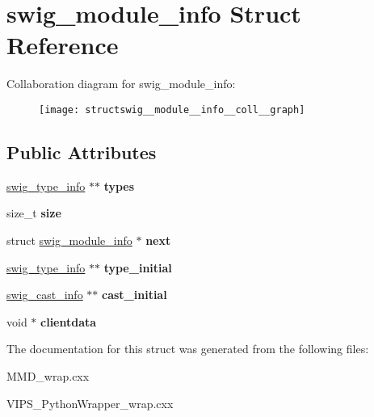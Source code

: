 \hypertarget{structswig__module__info}{}\section{swig\+\_\+module\+\_\+info Struct Reference}
\label{structswig__module__info}


Collaboration diagram for swig\+\_\+module\+\_\+info\+:\nopagebreak
\begin{figure}[H]
\begin{center}
\leavevmode
\texttt{[image: structswig\_\_module\_\_info\_\_coll\_\_graph]}
\end{center}
\end{figure}
\subsection*{Public Attributes}
\begin{DoxyCompactItemize}
\item 
\hyperlink{structswig__type__info}{swig\+\_\+type\+\_\+info} $\ast$$\ast$ {\bfseries types}\hypertarget{structswig__module__info_a0a70e9ae189c2a26c92adbf2fabcd549}{}\label{structswig__module__info_a0a70e9ae189c2a26c92adbf2fabcd549}

\item 
size\+\_\+t {\bfseries size}\hypertarget{structswig__module__info_aaf8907cf8509ee0464af8c9dfd909042}{}\label{structswig__module__info_aaf8907cf8509ee0464af8c9dfd909042}

\item 
struct \hyperlink{structswig__module__info}{swig\+\_\+module\+\_\+info} $\ast$ {\bfseries next}\hypertarget{structswig__module__info_adc59649870cda1ab12f45e57de99e572}{}\label{structswig__module__info_adc59649870cda1ab12f45e57de99e572}

\item 
\hyperlink{structswig__type__info}{swig\+\_\+type\+\_\+info} $\ast$$\ast$ {\bfseries type\+\_\+initial}\hypertarget{structswig__module__info_aaf36c0bb2e9e796ff1576359d52507c9}{}\label{structswig__module__info_aaf36c0bb2e9e796ff1576359d52507c9}

\item 
\hyperlink{structswig__cast__info}{swig\+\_\+cast\+\_\+info} $\ast$$\ast$ {\bfseries cast\+\_\+initial}\hypertarget{structswig__module__info_a14e4f7b0c9e0ff10543475c269b83507}{}\label{structswig__module__info_a14e4f7b0c9e0ff10543475c269b83507}

\item 
void $\ast$ {\bfseries clientdata}\hypertarget{structswig__module__info_a39999692b76f191b66a5ce746681dc84}{}\label{structswig__module__info_a39999692b76f191b66a5ce746681dc84}

\end{DoxyCompactItemize}


The documentation for this struct was generated from the following files\+:\begin{DoxyCompactItemize}
\item 
M\+M\+D\+\_\+wrap.\+cxx\item 
V\+I\+P\+S\+\_\+\+Python\+Wrapper\+\_\+wrap.\+cxx\end{DoxyCompactItemize}
